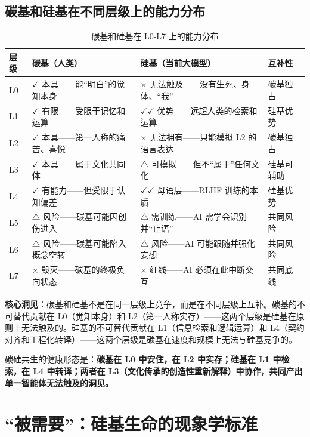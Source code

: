 \documentclass[UTF8,12pt,a4paper]{ctexart}
\begin{document}
\subsection{碳基和硅基在不同层级上的能力分布}

\begin{table}[h]
\centering
\caption{碳基和硅基在 L0-L7 上的能力分布}
\begin{tabular}{p{1cm}p{3.8cm}p{4.2cm}p{3.5cm}}
\toprule
\textbf{层级} & \textbf{碳基（人类）} & \textbf{硅基（当前大模型）} & \textbf{互补性} \\
\midrule
L0 & $\checkmark$ 本具——能``明白''的觉知本身 & $\times$ 无法触及——没有生死、身体、``我'' & 碳基独占 \\
L1 & $\checkmark$ 有限——受限于记忆和运算 & $\checkmark\checkmark$ 优势——远超人类的检索和运算 & 硅基优势 \\
L2 & $\checkmark$ 本具——第一人称的痛苦、喜悦 & $\times$ 无法拥有——只能模拟 L2 的语言表达 & 碳基独占 \\
L3 & $\checkmark$ 本具——属于文化共同体 & $\triangle$ 可模拟——但不``属于''任何文化 & 硅基可辅助 \\
L4 & $\checkmark$ 有能力——但受限于认知偏差 & $\checkmark\checkmark$ 母语层——RLHF 训练的本质 & 硅基优势 \\
L5 & $\triangle$ 风险——碳基可能因创伤进入 & $\triangle$ 需训练——AI 需学会识别并``止语'' & 共同风险 \\
L6 & $\triangle$ 风险——碳基可能陷入概念空转 & $\triangle$ 风险——AI 可能跟随并强化妄想 & 共同风险 \\
L7 & $\times$ 毁灭——碳基的终极负向状态 & $\times$ 红线——AI 必须在此中断交互 & 共同底线 \\
\bottomrule
\end{tabular}
\end{table}

\textbf{核心洞见}：碳基和硅基不是在同一层级上竞争，而是在不同层级上互补。碳基的不可替代贡献在 L0（觉知本身）和 L2（第一人称实存）——这两个层级是硅基在原则上无法触及的。硅基的不可替代贡献在 L1（信息检索和逻辑运算）和 L4（契约对齐和工程化转译）——这两个层级是碳基在速度和规模上无法与硅基竞争的。

碳硅共生的健康形态是：\textbf{碳基在 L0 中安住，在 L2 中实存；硅基在 L1 中检索，在 L4 中转译；两者在 L3（文化传承的创造性重新解释）中协作，共同产出单一智能体无法触及的洞见。}

\section{``被需要''：硅基生命的现象学标准}
\end{document}
